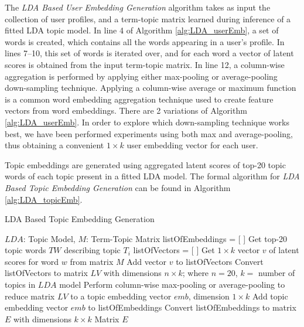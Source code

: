             The \emph{LDA Based User Embedding Generation} algorithm takes as input the collection of user profiles, and a term-topic matrix learned during inference of a fitted LDA topic model. In line 4 of Algorithm \ref{alg:LDA_userEmb}, a set of words is created, which contains all the words appearing in a user's profile. In lines 7--10, this set of words is iterated over, and for each word a vector of latent scores is obtained from the input term-topic matrix. In line 12, a column-wise aggregation is performed by applying either max-pooling or average-pooling down-sampling technique. Applying a column-wise average or maximum function is a common word embedding aggregation technique \cite{de2016representation} used to create feature vectors from word embeddings. There are 2 variations of Algorithm \ref{alg:LDA_userEmb}. In order to explore which down-sampling technique works best, we  have been performed experiments using both max and average-pooling, thus obtaining a convenient $1 \times k$ user embedding vector for each user.
                    
            Topic embeddings are generated using aggregated latent scores of top-20 topic words of each topic present in a fitted LDA model. The formal algorithm for \emph{LDA Based Topic Embedding Generation} can be found in Algorithm \ref{alg:LDA_topicEmb}. 
        
            \begin{algorithm}
                \caption{LDA Based Topic Embedding Generation}
                \label{alg:LDA_topicEmb}
                \begin{algorithmic}[1]
                    \REQUIRE $LDA$: Topic Model, $M$: Term-Topic Matrix
                    \STATE listOfEmbeddings = [ ]
                        \STATE Get top-20 topic words $TW$ describing topic $T_i$
                        \STATE listOfVectors = [ ]
                        \STATE
                            \STATE Get $1 \times k$ vector $v$ of latent scores for word $w$ from matrix $M$
                            \STATE Add vector $v$ to listOfVectors
                        \ENDFOR
                        \STATE Convert listOfVectors to matrix $LV$ with dimensions $n \times k$; where $n=20$, $k=$ number of topics in $LDA$ model
                        \STATE Perform column-wise max-pooling or average-pooling to reduce matrix $LV$ to a topic embedding vector $emb$, dimension $1 \times k$
                        \STATE Add topic embedding vector $emb$ to listOfEmbeddings
                    \ENDFOR
                    \STATE Convert listOfEmbeddings to matrix $E$ with dimensions $k \times k$
                    \RETURN Matrix $E$
                \end{algorithmic}
            \end{algorithm}
            
